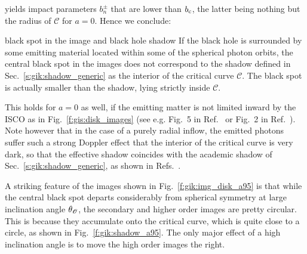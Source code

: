yields impact parameters $b_n^\pm$ that are lower than $b_{\rm c}$, the latter being
nothing but the radius of $\mathscr{C}$ for $a=0$.
Hence we conclude:
\begin{tprop}{black spot in the image and black hole shadow}{}
If the black hole is surrounded by some emitting material
located within some of the spherical photon orbits,
the central black spot in the images does not correspond to
the shadow defined in Sec.~\ref{s:gik:shadow_generic} as the interior of the critical curve $\mathscr{C}$. The black spot is actually smaller than the shadow, lying strictly inside $\mathscr{C}$.
\end{tprop}
This holds for $a=0$ as well, if the emitting matter is not limited inward by the ISCO
as in Fig.~\ref{f:gis:disk_images} (see e.g. Fig.~5 in Ref.~\cite{GrallHW19}
or Fig.~2 in Ref.~\cite{VinceWAGLPG21}). Note however that in the case of a
purely radial inflow, the emitted photons suffer such a strong Doppler effect that
the interior of the critical curve is very dark, so that the effective shadow
coincides with the academic shadow of Sec.~\ref{s:gik:shadow_generic},
as shown in Refs.~\cite{FalckMA00,NarayJG19}.


A striking feature of the images shown in Fig.~\ref{f:gik:img_disk_a95} is that
while the central black spot departs considerably from spherical symmetry at large
inclination angle $\theta_{\mathscr{O}}$, the secondary and higher order images are pretty
circular. This is because they accumulate onto the critical curve, which is
quite close to a circle, as shown in Fig.~\ref{f:gik:shadow_a95}. The only
major effect of a high inclination angle is to move the high order images
the right.

